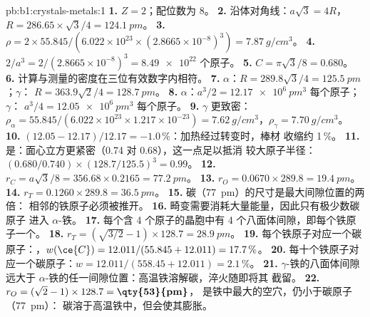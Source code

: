 \begin{solution}{pb:b1:crystals-metals:1}
\textbf{1.} $Z = 2$；配位数为 8。
\textbf{2.} 沿体对角线：$a\sqrt3 = 4R$，$R = 286.65 \times
\sqrt3/4 = \qty{124.1}{pm}$。
\textbf{3.} $\rho = 2 \times 55.845/(6.022 \times 10^{23} \times (2.8665
\times 10^{-8})^3) = \qty{7.87}{g/cm^3}$。
\textbf{4.} $2/a^3 = 2/(2.8665 \times 10^{-8})^3 = \num{8.49e22}$ 个原子。
\textbf{5.} $C = \pi\sqrt3/8 = 0.680$。
\textbf{6.} 计算与测量的密度在三位有效数字内相符。
\textbf{7.} $\alpha$：$R = 289.8\sqrt3/4 = \qty{125.5}{pm}$；$\gamma$：
$R = 363.9\sqrt2/4 = \qty{128.7}{pm}$。
\textbf{8.} $\alpha$：$a^3/2 = \qty{12.17e6}{pm^3}$ 每个原子；$\gamma$：
$a^3/4 = \qty{12.05e6}{pm^3}$ 每个原子。
\textbf{9.} $\gamma$ 更致密：$\rho_\alpha = 55.845/(6.022 \times 10^{23}
\times 1.217 \times 10^{-23}) = \qty{7.62}{g/cm^3}$，$\rho_\gamma =
\qty{7.70}{g/cm^3}$。
\textbf{10.} $(12.05 - 12.17)/12.17 = -1.0\,\%$：加热经过转变时，棒材
收缩约 1\,\%。
\textbf{11.} 是：面心立方更紧密（0.74 对 0.68），这一点足以抵消
较大原子半径：$(0.680/0.740) \times (128.7/125.5)^3 = 0.99$。
\textbf{12.} $r_C = a\sqrt3/8 = 356.68 \times 0.2165 = \qty{77.2}{pm}$。
\textbf{13.} $r_O = 0.0670 \times 289.8 = \qty{19.4}{pm}$。
\textbf{14.} $r_T = 0.1260 \times 289.8 = \qty{36.5}{pm}$。
\textbf{15.} 碳（\qty{77}{pm}）的尺寸是最大间隙位置的两倍：
相邻的铁原子必须被推开。
\textbf{16.} 畸变需要消耗大量能量，因此只有极少数碳原子
进入 $\alpha$-铁。
\textbf{17.} 每个含 4 个原子的晶胞中有 4 个八面体间隙，即每个铁原子一个。
\textbf{18.} $r_T = (\sqrt{3/2} - 1) \times 128.7 = \qty{28.9}{pm}$。
\textbf{19.} 每个铁原子对应一个碳原子：，$w(\ce{C}) = 12.011/(55.845 +
12.011) = 17.7\,\%$。
\textbf{20.} 每十个铁原子对应一个碳原子：$w = 12.011/(558.45 + 12.011) =
2.1\,\%$。
\textbf{21.} $\gamma$-铁的八面体间隙远大于
$\alpha$-铁的任一间隙位置：高温铁溶解碳，淬火随即将其
截留。
\textbf{22.} $r_O = (\sqrt2 - 1) \times 128.7 = \textbf{\qty{53}{pm}}$，
是铁中最大的空穴，仍小于碳原子（\qty{77}{pm}）：
碳溶于高温铁中，但会使其膨胀。
\end{solution}
